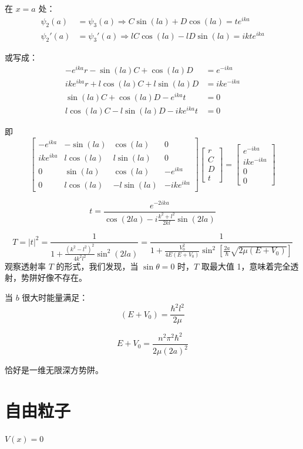 \documentclass[lang=cn,10pt]{elegantbook}
\begin{document}
\begin{solution}
	在 $x = a$ 处：
	\begin{align*}
		\psi_2(a) &= \psi_3(a) \Rightarrow C \sin(la) + D \cos(la) = t e^{ika} \tag{3} \\
		\psi_2'(a) &= \psi_3'(a) \Rightarrow lC \cos(la) - lD \sin(la) = ikt e^{ika} \tag{4}
	\end{align*}
	
	或写成：
	\begin{align*}
		-e^{ika} r - \sin(la) C + \cos(la) D &= e^{-ika} \\
		ike^{ika} r + l\cos(la) C + l\sin(la) D &= ike^{-ika} \\
		\sin(la) C + \cos(la) D - e^{ika} t &= 0 \\
		l\cos(la) C - l\sin(la) D - ike^{ika} t &= 0
	\end{align*}
	
	即
	\[
	\begin{bmatrix}
		-e^{ika} & -\sin(la) & \cos(la) & 0 \\
		ike^{ika} & l\cos(la) & l\sin(la) & 0 \\
		0 & \sin(la) & \cos(la) & -e^{ika} \\
		0 & l\cos(la) & -l\sin(la) & -ike^{ika}
	\end{bmatrix}
	\begin{bmatrix}
		r \\
		C \\
		D \\
		t
	\end{bmatrix}
	=
	\begin{bmatrix}
		e^{-ika} \\
		ike^{-ika} \\
		0 \\
		0
	\end{bmatrix}
	\]
\end{solution}

\[
t = \frac{e^{-2ika}}{\cos(2la) - i\frac{k^2+l^2}{2kl}\sin(2la)}
\]

\[
T = |t|^2 = \frac{1}{1 + \frac{(k^2 - l^2)^2}{4k^2l^2} \sin^2(2la)} = \frac{1}{1 + \frac{V_0^2}{4E(E + V_0)} \sin^2 \left[ \frac{2a}{\hbar} \sqrt{2\mu(E + V_0)} \right]}
\]
观察透射率 \( T \) 的形式，我们发现，当 \( \sin \theta = 0 \) 时，\( T \) 取最大值 1，意味着完全透射，势阱好像不存在。

当 \( b \) 很大时能量满足：
\[
(E + V_0) = \frac{\hbar^2 l^2}{2\mu}
\]

\[
E + V_0 = \frac{n^2 \pi^2 \hbar^2}{2\mu (2a)^2}
\]

恰好是一维无限深方势阱。
\section{自由粒子}
$V(x)=0$
\end{document}
